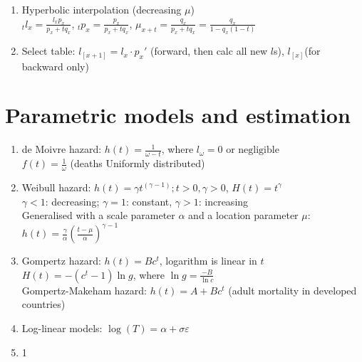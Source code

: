 \documentclass[11pt,a4paper]{article}
\begin{document}
\begin{enumerate}[resume]
\item Hyperbolic interpolation (decreasing $\mu$) \\
$\displaystyle {}_t l_x = \frac{l_x p_x}{p_x + t q_x}$, $\displaystyle {}_t p_x = \frac{p_x}{p_x + t q_x}$, $\displaystyle \mu_{x+t} = \frac{q_x}{p_x + t q_x} = \frac{q_x}{1 - q_x (1-t)}$

\item Select table: $l_{[x+1]} = l_x \cdot p_x'$ (forward, then calc all new $l$s), $l_{[x]}$(for backward only)

\end{enumerate}

\section*{Parametric models and estimation}
\begin{enumerate}[resume]

\item de Moivre hazard: $h(t) = \frac{1}{\omega - t}$, where $l_\omega = 0 \text{ or negligible}$ \\
$f(t) = \frac{1}{\omega}$ (deaths Uniformly distributed)

\item Weibull hazard: $h(t) = \gamma t^{(\gamma -1)}; t>0, \gamma>0$, $H(t) = t^\gamma$ \\
$\gamma<1$: decreasing; $\gamma=1$: constant, $\gamma>1$: increasing \\
Generalised with a scale parameter $\alpha$ and a location parameter $\mu$: $\displaystyle h(t) = \frac{\gamma}{\alpha} \left( \frac{t-\mu}{\alpha} \right)^{\gamma-1}$

\item Gompertz hazard: $h(t) = B c^t$, logarithm is linear in $t$ \\
$H(t) = - \left( c^t -1 \right) \ln g$, where $\displaystyle \ln g = \frac{-B}{\ln c}$\\
Gompertz-Makeham hazard: $h(t) = A + B c^t$ (adult mortality in developed countries)

\item Log-linear models: $\log (T) = \alpha + \sigma \varepsilon$


\item 1

\end{enumerate}
\end{document}
